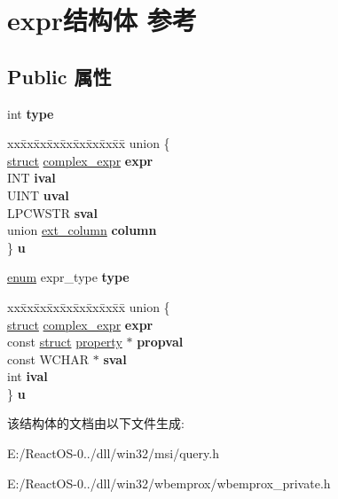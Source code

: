 \hypertarget{structexpr}{}\section{expr结构体 参考}
\label{structexpr}
\subsection*{Public 属性}
\begin{DoxyCompactItemize}
\item 
\mbox{\label{structexpr_ad1eb853b07c431c433e85da61a266f93}} 
int {\bfseries type}
\item 
\mbox{\label{structexpr_a56b527d976ff291680bcdc1c15433f7e}} 
\begin{tabbing}
xx\=xx\=xx\=xx\=xx\=xx\=xx\=xx\=xx\=\kill
union \{\\
\>\hyperlink{interfacestruct}{struct} \hyperlink{structcomplex__expr}{complex\_expr} {\bfseries expr}\\
\>INT {\bfseries ival}\\
\>UINT {\bfseries uval}\\
\>LPCWSTR {\bfseries sval}\\
\>union \hyperlink{unionext__column}{ext\_column} {\bfseries column}\\
\} {\bfseries u}\\

\end{tabbing}\item 
\mbox{\label{structexpr_a09ff299f23d066c20139cc2c5cd89e08}} 
\hyperlink{interfaceenum}{enum} expr\+\_\+type {\bfseries type}
\item 
\mbox{\label{structexpr_aacc58dbbfd25a14918a7bb1b23596ba8}} 
\begin{tabbing}
xx\=xx\=xx\=xx\=xx\=xx\=xx\=xx\=xx\=\kill
union \{\\
\>\hyperlink{interfacestruct}{struct} \hyperlink{structcomplex__expr}{complex\_expr} {\bfseries expr}\\
\>const \hyperlink{interfacestruct}{struct} \hyperlink{structproperty}{property} $\ast$ {\bfseries propval}\\
\>const WCHAR $\ast$ {\bfseries sval}\\
\>int {\bfseries ival}\\
\} {\bfseries u}\\

\end{tabbing}\end{DoxyCompactItemize}


该结构体的文档由以下文件生成\+:\begin{DoxyCompactItemize}
\item 
E\+:/\+React\+O\+S-\/0../dll/win32/msi/query.\+h\item 
E\+:/\+React\+O\+S-\/0../dll/win32/wbemprox/wbemprox\+\_\+private.\+h\end{DoxyCompactItemize}
